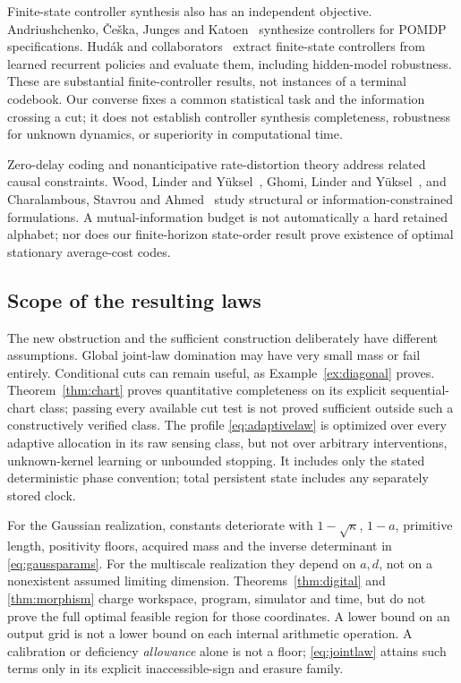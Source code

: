 Finite-state controller synthesis also has an independent objective. Andriushchenko, \v{C}e\v{s}ka, Junges and Katoen~\cite{inductive} synthesize controllers for POMDP specifications. Hud\'ak and collaborators~\cite{hudak} extract finite-state controllers from learned recurrent policies and evaluate them, including hidden-model robustness. These are substantial finite-controller results, not instances of a terminal codebook. Our converse fixes a common statistical task and the information crossing a cut; it does not establish controller synthesis completeness, robustness for unknown dynamics, or superiority in computational time.

Zero-delay coding and nonanticipative rate-distortion theory address related causal constraints. Wood, Linder and Y\"uksel~\cite{wood}, Ghomi, Linder and Y\"uksel~\cite{ghomi}, and Charalambous, Stavrou and Ahmed~\cite{nonanticipative} study structural or information-constrained formulations. A mutual-information budget is not automatically a hard retained alphabet; nor does our finite-horizon state-order result prove existence of optimal stationary average-cost codes.

\subsection{Scope of the resulting laws}
The new obstruction and the sufficient construction deliberately have different assumptions. Global joint-law domination may have very small mass or fail entirely. Conditional cuts can remain useful, as Example~\ref{ex:diagonal} proves. Theorem~\ref{thm:chart} proves quantitative completeness on its explicit sequential-chart class; passing every available cut test is not proved sufficient outside such a constructively verified class. The profile \eqref{eq:adaptivelaw} is optimized over every adaptive allocation in its raw sensing class, but not over arbitrary interventions, unknown-kernel learning or unbounded stopping. It includes only the stated deterministic phase convention; total persistent state includes any separately stored clock.

For the Gaussian realization, constants deteriorate with $1-\sqrt\kappa$, $1-a$, primitive length, positivity floors, acquired mass and the inverse determinant in \eqref{eq:gaussparams}. For the multiscale realization they depend on $a,d$, not on a nonexistent assumed limiting dimension. Theorems~\ref{thm:digital} and \ref{thm:morphism} charge workspace, program, simulator and time, but do not prove the full optimal feasible region for those coordinates. A lower bound on an output grid is not a lower bound on each internal arithmetic operation. A calibration or deficiency \emph{allowance} alone is not a floor; \eqref{eq:jointlaw} attains such terms only in its explicit inaccessible-sign and erasure family.

